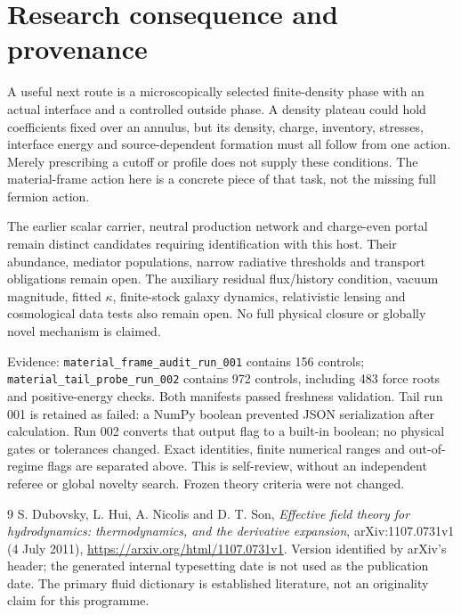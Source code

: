 \documentclass[11pt]{article}
\begin{document}
\section{Research consequence and provenance}
A useful next route is a microscopically selected finite-density phase
with an actual interface and a controlled outside phase. A density plateau
could hold coefficients fixed over an annulus, but its density, charge,
inventory, stresses, interface energy and source-dependent formation must
all follow from one action. Merely prescribing a cutoff or profile does
not supply these conditions. The material-frame action here is a concrete
piece of that task, not the missing full fermion action.

The earlier scalar carrier, neutral production network and charge-even
portal remain distinct candidates requiring identification with this
host. Their abundance, mediator populations, narrow radiative thresholds
and transport obligations remain open. The auxiliary residual flux/history
condition, vacuum magnitude, fitted $\kappa$, finite-stock galaxy dynamics,
relativistic lensing and cosmological data tests also remain open. No
full physical closure or globally novel mechanism is claimed.

Evidence: \texttt{material\_frame\_audit\_run\_001} contains 156 controls;
\texttt{material\_tail\_probe\_run\_002} contains 972 controls, including
483 force roots and positive-energy checks. Both manifests passed freshness
validation. Tail run 001 is retained as failed: a NumPy boolean prevented
JSON serialization after calculation. Run 002 converts that output flag
to a built-in boolean; no physical gates or tolerances changed. Exact
identities, finite numerical ranges and out-of-regime flags are separated
above. This is self-review, without an independent referee or global
novelty search. Frozen theory criteria were not changed.

\begin{thebibliography}{9}
 S. Dubovsky, L. Hui, A. Nicolis and D. T. Son,
\emph{Effective field theory for hydrodynamics: thermodynamics, and the
derivative expansion}, arXiv:1107.0731v1 (4 July 2011),
\url{https://arxiv.org/html/1107.0731v1}. Version identified by arXiv's
header; the generated internal typesetting date is not used as the
publication date. The primary fluid dictionary is established literature,
not an originality claim for this programme.
\end{thebibliography}
\end{document}
